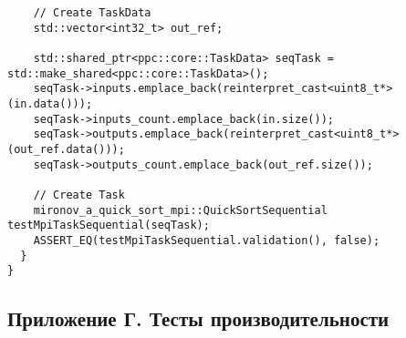 \documentclass[12pt]{article}
\begin{document}
\begin{lstlisting}
    // Create TaskData
    std::vector<int32_t> out_ref;

    std::shared_ptr<ppc::core::TaskData> seqTask = std::make_shared<ppc::core::TaskData>();
    seqTask->inputs.emplace_back(reinterpret_cast<uint8_t*>(in.data()));
    seqTask->inputs_count.emplace_back(in.size());
    seqTask->outputs.emplace_back(reinterpret_cast<uint8_t*>(out_ref.data()));
    seqTask->outputs_count.emplace_back(out_ref.size());

    // Create Task
    mironov_a_quick_sort_mpi::QuickSortSequential testMpiTaskSequential(seqTask);
    ASSERT_EQ(testMpiTaskSequential.validation(), false);
  }
}

\end{lstlisting}
\subsection*{Приложение Г. Тесты производительности}
\end{document}
